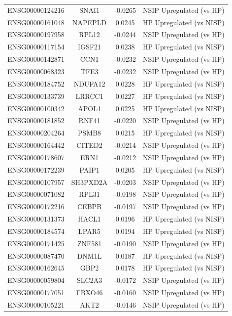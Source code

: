 \documentclass[
]{article}
\begin{document}
\begin{singlespace}
\begin{longtable}[t]{lccc}
\addlinespace
ENSG00000124216 & SNAI1 & -0.0265 & NSIP Upregulated (vs HP)\\
ENSG00000161048 & NAPEPLD & 0.0245 & HP Upregulated (vs NISP)\\
ENSG00000197958 & RPL12 & -0.0244 & NSIP Upregulated (vs HP)\\
ENSG00000117154 & IGSF21 & 0.0238 & HP Upregulated (vs NISP)\\
ENSG00000142871 & CCN1 & -0.0232 & NSIP Upregulated (vs HP)\\
\addlinespace
ENSG00000068323 & TFE3 & -0.0232 & NSIP Upregulated (vs HP)\\
ENSG00000184752 & NDUFA12 & 0.0228 & HP Upregulated (vs NISP)\\
ENSG00000133739 & LRRCC1 & 0.0227 & HP Upregulated (vs NISP)\\
ENSG00000100342 & APOL1 & 0.0225 & HP Upregulated (vs NISP)\\
ENSG00000181852 & RNF41 & -0.0220 & NSIP Upregulated (vs HP)\\
\addlinespace
ENSG00000204264 & PSMB8 & 0.0215 & HP Upregulated (vs NISP)\\
ENSG00000164442 & CITED2 & -0.0214 & NSIP Upregulated (vs HP)\\
ENSG00000178607 & ERN1 & -0.0212 & NSIP Upregulated (vs HP)\\
ENSG00000172239 & PAIP1 & 0.0205 & HP Upregulated (vs NISP)\\
ENSG00000107957 & SH3PXD2A & -0.0203 & NSIP Upregulated (vs HP)\\
\addlinespace
ENSG00000071082 & RPL31 & -0.0198 & NSIP Upregulated (vs HP)\\
ENSG00000172216 & CEBPB & -0.0197 & NSIP Upregulated (vs HP)\\
ENSG00000131373 & HACL1 & 0.0196 & HP Upregulated (vs NISP)\\
ENSG00000184574 & LPAR5 & 0.0194 & HP Upregulated (vs NISP)\\
ENSG00000171425 & ZNF581 & -0.0190 & NSIP Upregulated (vs HP)\\
\addlinespace
ENSG00000087470 & DNM1L & 0.0187 & HP Upregulated (vs NISP)\\
ENSG00000162645 & GBP2 & 0.0178 & HP Upregulated (vs NISP)\\
ENSG00000059804 & SLC2A3 & -0.0172 & NSIP Upregulated (vs HP)\\
ENSG00000177051 & FBXO46 & -0.0160 & NSIP Upregulated (vs HP)\\
ENSG00000105221 & AKT2 & -0.0146 & NSIP Upregulated (vs HP)\\

\end{longtable}
\end{singlespace}
\end{document}
